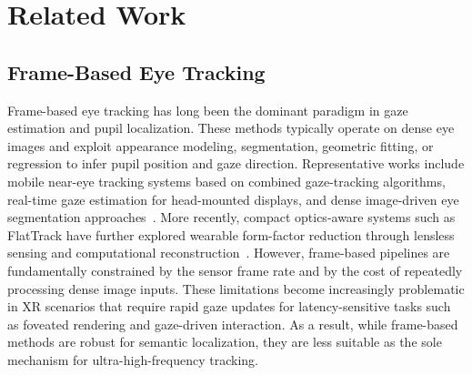 \documentclass[journal]{IEEEtran}
\begin{document}
\section{Related Work}
\label{sec:related}
\subsection{Frame-Based Eye Tracking}
Frame-based eye tracking has long been the dominant paradigm in gaze estimation and pupil localization. These methods typically operate on dense eye images and exploit appearance modeling, segmentation, geometric fitting, or regression to infer pupil position and gaze direction. Representative works include mobile near-eye tracking systems based on combined gaze-tracking algorithms, real-time gaze estimation for head-mounted displays, and dense image-driven eye segmentation approaches~\cite{li2018etracker,feng2022real,chen2022real}. More recently, compact optics-aware systems such as FlatTrack have further explored wearable form-factor reduction through lensless sensing and computational reconstruction~\cite{jain2025flattrack}.
%
However, frame-based pipelines are fundamentally constrained by the sensor frame rate and by the cost of repeatedly processing dense image inputs. These limitations become increasingly problematic in XR scenarios that require rapid gaze updates for latency-sensitive tasks such as foveated rendering and gaze-driven interaction. As a result, while frame-based methods are robust for semantic localization, they are less suitable as the sole mechanism for ultra-high-frequency tracking.
%
\end{document}
